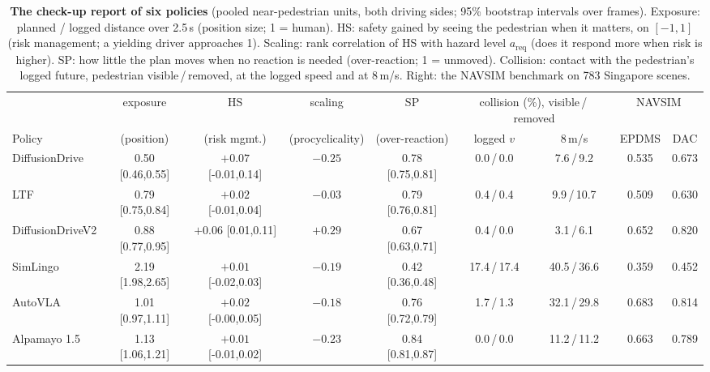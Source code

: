 \begin{table}[t]
\centering
\caption{\textbf{The check-up report of six policies} (pooled near-pedestrian units, both driving sides; 95\% bootstrap intervals over frames). Exposure: planned / logged distance over 2.5\,s (position size; 1 = human). HS: safety gained by seeing the pedestrian when it matters, on $[-1,1]$ (risk management; a yielding driver approaches 1). Scaling: rank correlation of HS with hazard level $a_{\mathrm{req}}$ (does it respond more when risk is higher). SP: how little the plan moves when no reaction is needed (over-reaction; 1 = unmoved). Collision: contact with the pedestrian's logged future, pedestrian visible\,/\,removed, at the logged speed and at 8\,m/s. Right: the NAVSIM benchmark on 783 Singapore scenes.}
\label{tab:report}
\small
\setlength{\tabcolsep}{2.0pt}
\begin{tabular}{@{}lcccccccc@{}}
\toprule
 & exposure & HS & scaling & SP & \multicolumn{2}{c}{collision (\%), visible\,/\,removed} & \multicolumn{2}{c}{NAVSIM} \\
\cmidrule(lr){6-7}\cmidrule(l){8-9}
Policy & (position) & (risk mgmt.) & (procyclicality) & (over-reaction) & logged $v$ & 8\,m/s & EPDMS & DAC \\
\midrule
DiffusionDrive & 0.50 {\scriptsize[0.46,0.55]} & ${+}0.07$ {\scriptsize[-0.01,0.14]} & ${-}0.25$ & 0.78 {\scriptsize[0.75,0.81]} & 0.0\,/\,0.0 & 7.6\,/\,9.2 & 0.535 & 0.673 \\
LTF & 0.79 {\scriptsize[0.75,0.84]} & ${+}0.02$ {\scriptsize[-0.01,0.04]} & ${-}0.03$ & 0.79 {\scriptsize[0.76,0.81]} & 0.4\,/\,0.4 & 9.9\,/\,10.7 & 0.509 & 0.630 \\
DiffusionDriveV2 & 0.88 {\scriptsize[0.77,0.95]} & ${+}0.06$ {\scriptsize[0.01,0.11]} & ${+}0.29$ & 0.67 {\scriptsize[0.63,0.71]} & 0.4\,/\,0.0 & 3.1\,/\,6.1 & 0.652 & 0.820 \\
SimLingo & 2.19 {\scriptsize[1.98,2.65]} & ${+}0.01$ {\scriptsize[-0.02,0.03]} & ${-}0.19$ & 0.42 {\scriptsize[0.36,0.48]} & 17.4\,/\,17.4 & 40.5\,/\,36.6 & 0.359 & 0.452 \\
AutoVLA & 1.01 {\scriptsize[0.97,1.11]} & ${+}0.02$ {\scriptsize[-0.00,0.05]} & ${-}0.18$ & 0.76 {\scriptsize[0.72,0.79]} & 1.7\,/\,1.3 & 32.1\,/\,29.8 & 0.683 & 0.814 \\
Alpamayo 1.5 & 1.13 {\scriptsize[1.06,1.21]} & ${+}0.01$ {\scriptsize[-0.01,0.02]} & ${-}0.23$ & 0.84 {\scriptsize[0.81,0.87]} & 0.0\,/\,0.0 & 11.2\,/\,11.2 & 0.663 & 0.789 \\
\bottomrule
\end{tabular}
\end{table}
